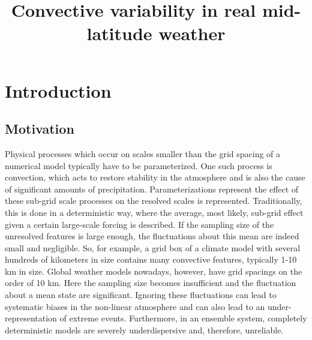 \documentclass[a4paper, 12pt]{article}
\title{Convective variability in real mid-latitude weather}
\begin{document}
\maketitle
	
\section{Introduction}

\subsection{Motivation}
Physical processes which occur on scales smaller than the grid spacing of a numerical model typically have to be parameterized. One such process is convection, which acts to restore stability in the atmosphere and is also the cause of significant amounts of precipitation. Parameterizations represent the effect of these sub-grid scale processes on the resolved scales is represented. Traditionally, this is done in a deterministic way, where the average, most likely, sub-grid effect given a certain large-scale forcing is described. If the sampling size of the unresolved features is large enough, the fluctuations about this mean are indeed small and negligible. So, for example, a grid box of a climate model with several hundreds of kilometers in size contains many convective features, typically 1-10 km in size. Global weather models nowadays, however, have grid spacings on the order of 10 km. Here the sampling size becomes insufficient and the fluctuation about a mean state are significant. Ignoring these fluctuations can lead to systematic biases in the non-linear atmosphere \citep[e.g.][]{Berner2016} and can also lead to an under-representation of extreme events. Furthermore, in an ensemble system, completely deterministic models are severely underdispersive and, therefore, unreliable. 
\end{document}
